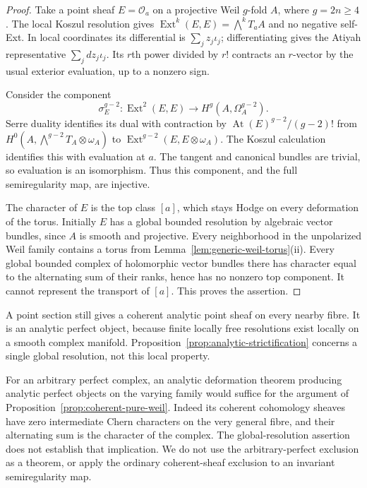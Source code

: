 \begin{proof}
Take a point sheaf $E=\mathcal O_a$ on a projective Weil
$g$-fold $A$, where $g=2n\ge4$.  The local Koszul resolution
gives $\operatorname{Ext}^k(E,E)=\bigwedge^kT_aA$ and no
negative self-Ext.  In local coordinates its differential is
$\sum_j z_j\iota_j$; differentiating gives the Atiyah
representative $\sum_j dz_j\iota_j$.  Its $r$th power divided
by $r!$ contracts an $r$-vector by the usual exterior evaluation,
up to a nonzero sign.

Consider the component
\[
 \sigma_E^{g-2}:\operatorname{Ext}^2(E,E)
       \longrightarrow H^g(A,\Omega_A^{g-2}).
\]
Serre duality identifies its dual with contraction by
$\operatorname{At}(E)^{g-2}/(g-2)!$ from
$H^0(A,\bigwedge^{g-2}T_A\otimes\omega_A)$ to
$\operatorname{Ext}^{g-2}(E,E\otimes\omega_A)$.
The Koszul calculation identifies this with evaluation at $a$.
The tangent and canonical bundles are trivial, so evaluation
is an isomorphism.  Thus this component, and the full
semiregularity map, are injective.

The character of $E$ is the top class $[a]$, which stays Hodge
on every deformation of the torus.  Initially $E$ has a global
bounded resolution by algebraic vector bundles, since $A$ is
smooth and projective.  Every neighborhood in the unpolarized
Weil family contains a torus from
Lemma~\ref{lem:generic-weil-torus}(ii).  Every global bounded
complex of holomorphic vector bundles there has character
equal to the alternating sum of their ranks, hence has no
nonzero top component.  It cannot represent the transport of
$[a]$.  This proves the assertion.
\end{proof}

A point section still gives a coherent analytic point sheaf on
every nearby fibre.  It is an analytic perfect object, because
finite locally free resolutions exist locally on a smooth
complex manifold.  Proposition~\ref{prop:analytic-strictification}
concerns a single global resolution, not this local property.

For an arbitrary perfect complex, an analytic deformation theorem
producing analytic perfect objects on the varying family would
suffice for the argument of
Proposition~\ref{prop:coherent-pure-weil}.  Indeed its coherent
cohomology sheaves have zero intermediate Chern characters on
the very general fibre, and their alternating sum is the
character of the complex.  The global-resolution assertion
does not establish that implication.  We do not use the
arbitrary-perfect exclusion as a theorem, or apply the ordinary
coherent-sheaf exclusion to an invariant semiregularity map.
